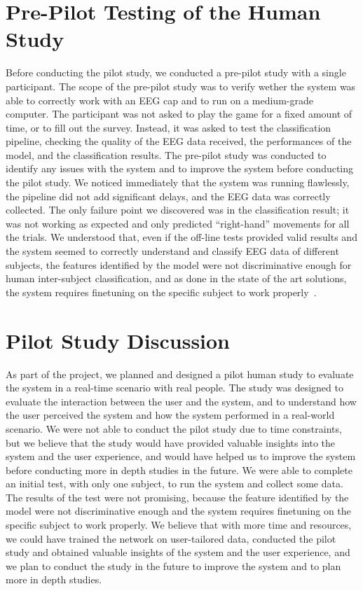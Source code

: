 \section{Pre-Pilot Testing of the Human Study}
Before conducting the pilot study, we conducted a pre-pilot study with a single participant.
The scope of the pre-pilot study was to verify wether the system was able to correctly work with an EEG cap and to run on a medium-grade computer.
The participant was not asked to play the game for a fixed amount of time, or to fill out the survey.
Instead, it was asked to test the classification pipeline, checking the quality of the EEG data received, the performances of the model, and the classification results.
The pre-pilot study was conducted to identify any issues with the system and to improve the system before conducting the pilot study.
We noticed immediately that the system was running flawlessly, the pipeline did not add significant delays, and the EEG data was correctly collected.
The only failure point we discovered was in the classification result; it was not working as expected and only predicted ``right-hand'' movements for all the trials.
We understood that, even if the off-line tests provided valid results and the system seemed to correctly understand and classify EEG data of different subjects, the features identified by the model were not discriminative enough for human inter-subject classification, and as done in the state of the art solutions, the system requires finetuning on the specific subject to work properly~\cite{jia2023excellent}.

\section{Pilot Study Discussion}
As part of the project, we planned and designed a pilot human study to evaluate the system in a real-time scenario with real people.
The study was designed to evaluate the interaction between the user and the system, and to understand how the user perceived the system and how the system performed in a real-world scenario.
We were not able to conduct the pilot study due to time constraints, but we believe that the study would have provided valuable insights into the system and the user experience, and would have helped us to improve the system before conducting more in depth studies in the future.
We were able to complete an initial test, with only one subject, to run the system and collect some data.
The results of the test were not promising, because the feature identified by the model were not discriminative enough and the system requires finetuning on the specific subject to work properly.
We believe that with more time and resources, we could have trained the network on user-tailored data, conducted the pilot study and obtained valuable insights of the system and the user experience, and we plan to conduct the study in the future to improve the system and to plan more in depth studies.